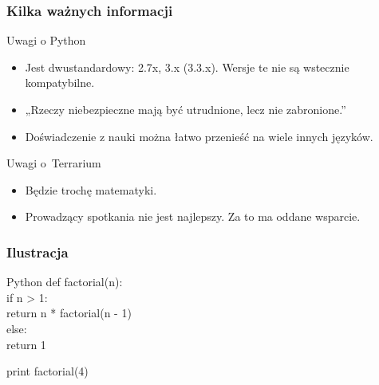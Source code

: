 \documentclass[10pt,t]{beamer}
\begin{document}
\begin{frame}
  \frametitle{Kilka ważnych informacji}


  Uwagi o Python \\
  \begin{itemize}
    \RaggedRight

  \item Jest dwustandardowy: 2.7x, 3.x (3.3.x). Wersje te nie są wstecznie
    kompatybilne.

  \item „Rzeczy niebezpieczne mają być utrudnione, lecz nie zabronione.”

  \item Doświadczenie z nauki można łatwo przenieść na wiele innych języków.

  \end{itemize}

  Uwagi o~Terrarium \\
  \begin{itemize}
    \RaggedRight

  \item Będzie trochę matematyki.

  \item Prowadzący spotkania nie jest najlepszy. Za to ma oddane wsparcie.

  \end{itemize}

\end{frame}





\begin{frame}
  \frametitle{Ilustracja}

  Python
  def factorial(n): \\
  \hspace{5mm} if n > 1: \\
  \hspace{10mm} return n * factorial(n - 1) \\
  \hspace{5mm} else: \\
  \hspace{10mm} return 1 \\

  \vspace{8pt}

  print factorial(4)

\end{frame}
\end{document}
